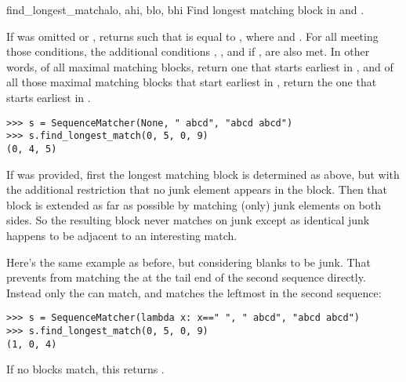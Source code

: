 \begin{methoddesc}{find_longest_match}{alo, ahi, blo, bhi}
  Find longest matching block in 
  and .

  If  was omitted or ,
   returns  such that  is equal
  to , where 
       and
      .
  For all  meeting those
  conditions, the additional conditions
      ,
      ,
      and if , 
  are also met.
  In other words, of all maximal matching blocks, return one that
  starts earliest in , and of all those maximal matching blocks
  that start earliest in , return the one that starts earliest
  in .

\begin{verbatim}
>>> s = SequenceMatcher(None, " abcd", "abcd abcd")
>>> s.find_longest_match(0, 5, 0, 9)
(0, 4, 5)
\end{verbatim}

  If  was provided, first the longest matching block is
  determined as above, but with the additional restriction that no
  junk element appears in the block.  Then that block is extended as
  far as possible by matching (only) junk elements on both sides.
  So the resulting block never matches on junk except as identical
  junk happens to be adjacent to an interesting match.

  Here's the same example as before, but considering blanks to be junk.
  That prevents  from matching the  at the
  tail end of the second sequence directly.  Instead only the
   can match, and matches the leftmost  in
  the second sequence:

\begin{verbatim}
>>> s = SequenceMatcher(lambda x: x==" ", " abcd", "abcd abcd")
>>> s.find_longest_match(0, 5, 0, 9)
(1, 0, 4)
\end{verbatim}

  If no blocks match, this returns .
\end{methoddesc}

